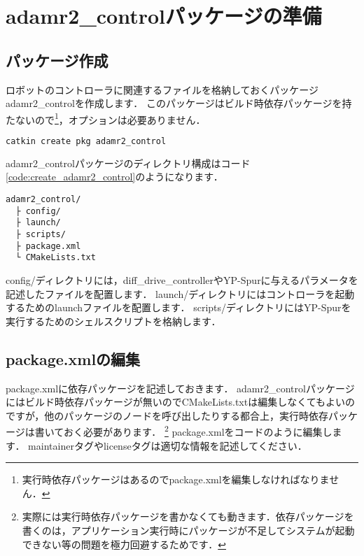 \documentclass[{../../master}]{subfiles}
\begin{document}
\section{\textsf{adamr2\_control}パッケージの準備}

\subsection{パッケージ作成}

ロボットのコントローラに関連するファイルを格納しておくパッケージ\textsf{adamr2\_control}を作成します．
このパッケージはビルド時依存パッケージを持たないので\footnote{実行時依存パッケージはあるので\textsf{package.xml}を編集しなければなりません．}，オプションは必要ありません．

\begin{lstlisting}[language=sh, label=code:create_adamr2_control, caption= Create \textsf{adamr2\_control} Package]
catkin create pkg adamr2_control
\end{lstlisting}

\textsf{adamr2\_control}パッケージのディレクトリ構成はコード\ref{code:create_adamr2_control}のようになります．

\begin{lstlisting}[label=code:directory_structure_of_adamr2_control, caption=Directory Structure of \textsf{adamr2\_control}]
adamr2_control/
  ├ config/
  ├ launch/
  ├ scripts/
  ├ package.xml
  └ CMakeLists.txt
\end{lstlisting}

\textsf{config/}ディレクトリには，\textsf{diff\_drive\_controller}やYP-Spurに与えるパラメータを記述したファイルを配置します．
\textsf{launch/}ディレクトリにはコントローラを起動するためのlaunchファイルを配置します．
\textsf{scripts/}ディレクトリにはYP-Spurを実行するためのシェルスクリプトを格納します．

\subsection{\textsf{package.xml}の編集}

\textsf{package.xml}に依存パッケージを記述しておきます．
\textsf{adamr2\_control}パッケージにはビルド時依存パッケージが無いので\textsf{CMakeLists.txt}は編集しなくてもよいのですが，他のパッケージのノードを呼び出したりする都合上，実行時依存パッケージは書いておく必要があります．
\footnote{実際には実行時依存パッケージを書かなくても動きます．依存パッケージを書くのは，アプリケーション実行時にパッケージが不足してシステムが起動できない等の問題を極力回避するためです．}
\textsf{package.xml}をコードのように編集します．
\textsf{maintainer}タグや\textsf{license}タグは適切な情報を記述してください．
\end{document}
